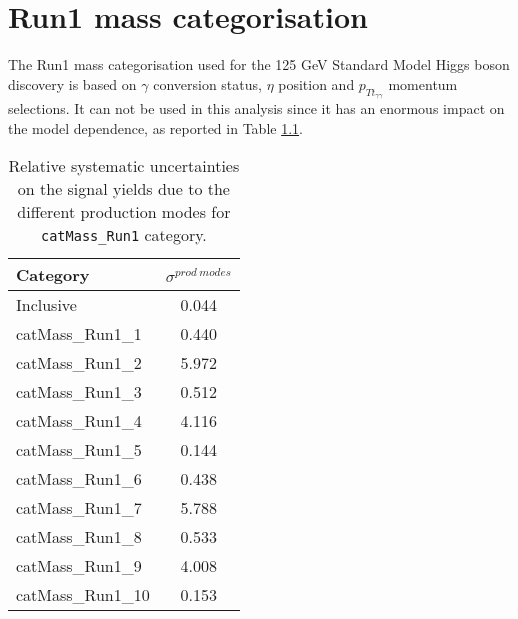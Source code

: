 \documentclass[a4paper, oneside, 11pt, openright]{book}
\begin{document}
	\chapter{Run1 mass categorisation}\label{appex:Run1}
		The Run1 mass categorisation used for the 125 GeV Standard Model Higgs boson discovery is based on $\gamma$ conversion status, $\eta$ position and  $p_{Tt_{\gamma\gamma}}$ momentum selections. It can not be used in this analysis since it has an enormous impact on the model dependence, as reported in Table \ref{tab:Run1}.
		\begin{table}[htbp]
			\begin{center}
				\begin{tabular}{lc}
					\toprule[1.5pt]
					Category			& $\sigma^{prod\ modes}$	\\
					\midrule
					Inclusive			& 0.044				\\
					\midrule
					catMass\_Run1\_1 	& 0.440				\\
					catMass\_Run1\_2 	& 5.972				\\
					catMass\_Run1\_3 	& 0.512				\\
					catMass\_Run1\_4 	& 4.116				\\
					catMass\_Run1\_5 	& 0.144				\\
					catMass\_Run1\_6 	& 0.438				\\
					catMass\_Run1\_7 	& 5.788				\\
					catMass\_Run1\_8 	& 0.533				\\
					catMass\_Run1\_9 	& 4.008				\\
					catMass\_Run1\_10 	& 0.153				\\
					\bottomrule[1.5pt]
				\end{tabular}
			\end{center}
			\caption{Relative systematic uncertainties on the signal yields due to the different production modes for \texttt{catMass\_Run1} category.}
			\label{tab:Run1}
		\end{table}
	

	

	
\end{document}
